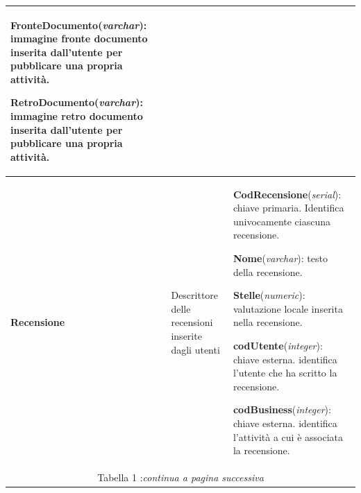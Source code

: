 \documentclass[a4paper,12pt]{article}
\begin{document}
\begin{flushleft}
\begin{table}[htbp]
\begin{tabular}[c]{| m{3cm} | m{5cm} | m{7cm} |}
{\bf FronteDocumento}({\it varchar}): immagine fronte documento inserita 
dall'utente per pubblicare una propria attività.

{\bf RetroDocumento}({\it varchar}): immagine retro documento inserita 
dall'utente per pubblicare una propria attività.
\\
\hline

{\bf Recensione}
&\small Descrittore delle recensioni inserite dagli utenti 
&\footnotesize
{\bf CodRecensione}({\it serial}): chiave primaria. Identifica univocamente ciascuna recensione.

{\bf Nome}({\it varchar}): testo della recensione.

{\bf Stelle}({\it numeric}): valutazione locale inserita nella recensione.

{\bf codUtente}({\it integer}): chiave esterna. identifica l'utente che 
ha scritto la recensione. 

{\bf codBusiness}({\it integer}): chiave esterna. identifica l'attività a
cui è associata la recensione.
\\
\hline

\multicolumn{3}{c}{\footnotesize{\normalsize *Tabella 1 :\it continua a pagina successiva}}
\end{tabular}

\end{table}
\end{flushleft}

\newpage
\end{document}

